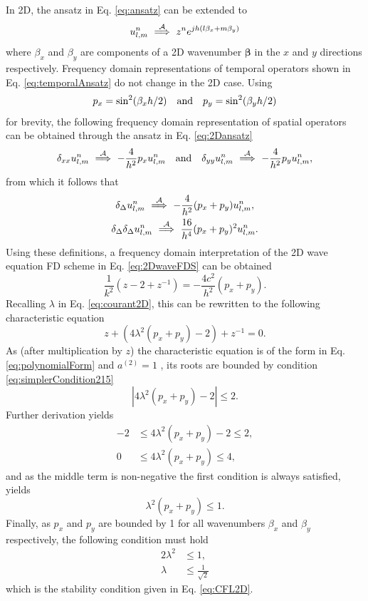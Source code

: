 In 2D, the ansatz in Eq. \eqref{eq:ansatz} can be extended to 
\begin{equation}\label{eq:2Dansatz}
    u_{l,m}^n \ \overset{\mathcal{A}}{\Longrightarrow}\  z^n e^{jh(l\beta_x + m\beta_y)}
\end{equation}
where $\beta_x$ and $\beta_y$ are components of a 2D wavenumber $\boldsymbol{\beta}$ in the $x$ and $y$ directions respectively. Frequency domain representations of temporal operators shown in Eq. \eqref{eq:temporalAnsatz} do not change in the 2D case. Using 
\begin{equation}\label{eq:pxpy}
    p_x = \sin^2(\beta_x h/2) \quad \text{and} \quad p_y = \sin^2(\beta_y h/2)
\end{equation}
for brevity, the following frequency domain representation of spatial operators can be obtained through the ansatz in Eq. \eqref{eq:2Dansatz}
\begin{equation}
    \delta_{xx} u_{l,m}^n \ \overset{\mathcal{A}}{\Longrightarrow}\  -\frac{4}{h^2}p_x 
    u_{l,m}^n \quad \text{and} \quad \delta_{yy} u_{l,m}^n \ \overset{\mathcal{A}}{\Longrightarrow}\  -\frac{4}{h^2}p_y 
    u_{l,m}^n,
\end{equation}
from which it follows that
\begin{gather}
    \delta_{\Delta}u_{l,m}^n \ \overset{\mathcal{A}}{\Longrightarrow}\  -\frac{4}{h^2}(p_x + p_y)u_{l,m}^n,\label{eq:laplacianAnsatz}\\
    \delta_{\Delta}\delta_{\Delta}u_{l,m}^n \ \overset{\mathcal{A}}{\Longrightarrow}\  \frac{16}{h^4}(p_x + p_y)^2u_{l,m}^n.\label{eq:biharmonicAnsatz}
\end{gather}
%
Using these definitions, a frequency domain interpretation of the 2D wave equation FD scheme in Eq. \eqref{eq:2DwaveFDS} can be obtained
\begin{equation*}
    \frac{1}{k^2}\left(z - 2 +z^{-1}\right) = -\frac{4c^2}{h^2} (p_x + p_y).
\end{equation*}
Recalling $\lambda$ in Eq. \eqref{eq:courant2D}, this can be rewritten to the following characteristic equation
\begin{equation}
    z + \left(4\lambda^2(p_x + p_y)-2\right) +z^{-1} = 0.
\end{equation}
As (after multiplication by $z$) the characteristic equation is of the form in Eq. \eqref{eq:polynomialForm} and $a^{(2)} = 1$ , its roots are bounded by condition \eqref{eq:simplerCondition215} 
\begin{equation*}
    \left|4\lambda^2(p_x + p_y)-2\right| \leq 2.
\end{equation*}
Further derivation yields
\begin{align*}
    -2 &\leq 4\lambda^2(p_x + p_y)-2 \leq 2, \\
    0 &\leq 4\lambda^2(p_x + p_y) \leq 4,
\end{align*} 
and as the middle term is non-negative the first condition is always satisfied, yields
\begin{equation*}
    \lambda^2(p_x + p_y) \leq 1.
\end{equation*}
Finally, as $p_x$ and $p_y$ are bounded by 1 for all wavenumbers $\beta_x$ and $\beta_y$ respectively, the following condition must hold
\begin{align}
    2\lambda^2&\leq 1,\nonumber\\
    \lambda &\leq \frac{1}{\sqrt{2}}
\end{align}
which is the stability condition given in Eq. \eqref{eq:CFL2D}.

